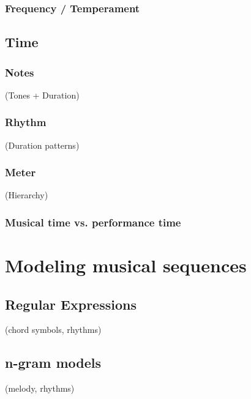 \documentclass[letterpaper,10pt,english]{sphinxmanual}
\begin{document}
\subsection{Frequency / Temperament}
\label{\detokenize{1_fundamentals:frequency-temperament}}

\section{Time}
\label{\detokenize{1_fundamentals:time}}

\subsection{Notes}
\label{\detokenize{1_fundamentals:notes}}
(Tones + Duration)


\subsection{Rhythm}
\label{\detokenize{1_fundamentals:rhythm}}
(Duration patterns)


\subsection{Meter}
\label{\detokenize{1_fundamentals:meter}}
(Hierarchy)


\subsection{Musical time vs. performance time}
\label{\detokenize{1_fundamentals:musical-time-vs-performance-time}}

\chapter{Modeling musical sequences}
\label{\detokenize{2_sequences:modeling-musical-sequences}}\label{\detokenize{2_sequences::doc}}

\section{Regular Expressions}
\label{\detokenize{2_sequences:regular-expressions}}
(chord symbols, rhythms)


\section{n-gram models}
\label{\detokenize{2_sequences:n-gram-models}}
(melody, rhythms)
\end{document}
